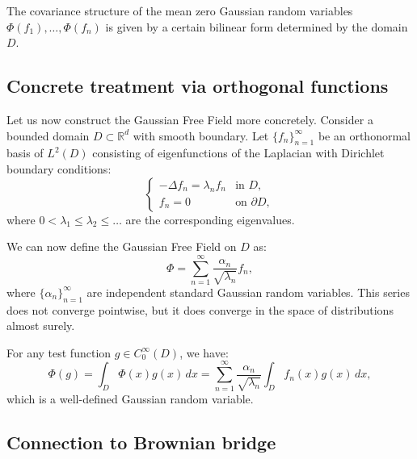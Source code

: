 \documentclass[letterpaper,11pt,oneside,reqno]{book}
\numberwithin{equation}{chapter}  %
\theoremstyle{definition}
\begin{document}
The covariance structure of the mean zero Gaussian random variables
$\Phi(f_1), \ldots, \Phi(f_n)$ is given by a certain bilinear
form determined by the domain $D$.


\subsection{Concrete treatment via orthogonal functions}

Let us now construct the Gaussian Free Field more concretely. Consider a bounded domain $D \subset \mathbb{R}^d$ with smooth boundary. Let $\{f_n\}_{n=1}^{\infty}$ be an orthonormal basis of $L^2(D)$ consisting of eigenfunctions of the Laplacian with Dirichlet boundary conditions:
\begin{equation}
    \begin{cases}
        -\Delta f_n = \lambda_n f_n & \text{in } D, \\
        f_n = 0 & \text{on } \partial D,
    \end{cases}
\end{equation}
where $0 < \lambda_1 \leq \lambda_2 \leq \ldots$ are the corresponding eigenvalues.

We can now define the Gaussian Free Field on $D$ as:
\begin{equation}
    \Phi = \sum_{n=1}^{\infty} \frac{\alpha_n}{\sqrt{\lambda_n}} f_n,
\end{equation}
where $\{\alpha_n\}_{n=1}^{\infty}$ are independent standard Gaussian random variables. This series does not converge pointwise, but it does converge in the space of distributions almost surely.

For any test function $g \in C_0^{\infty}(D)$, we have:
\begin{equation}
    \Phi(g) = \int_D \Phi(x) g(x) \, dx = \sum_{n=1}^{\infty} \frac{\alpha_n}{\sqrt{\lambda_n}} \int_D f_n(x) g(x) \, dx,
\end{equation}
which is a well-defined Gaussian random variable.

\subsection{Connection to Brownian bridge}
\end{document}
